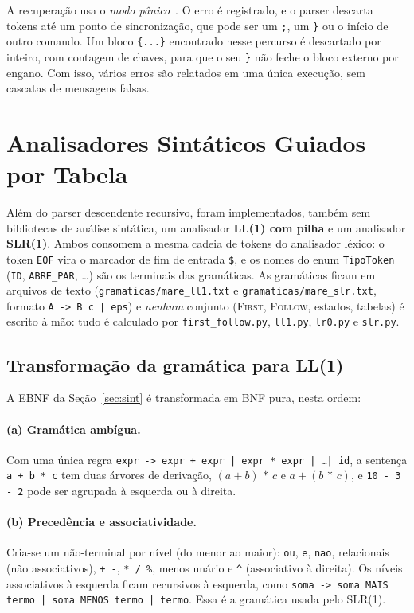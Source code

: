 \documentclass[conference]{IEEEtran}
\begin{document}
A recuperação usa o \emph{modo pânico}~\cite{aho2006}. O erro é registrado, e
o parser descarta tokens até um ponto de sincronização, que pode ser um
\texttt{;}, um \texttt{\}} ou o início de outro comando. Um bloco
\texttt{\{...\}} encontrado nesse percurso é descartado por inteiro, com
contagem de chaves, para que o seu \texttt{\}} não feche o bloco externo por
engano. Com isso, vários erros são relatados em uma única execução, sem
cascatas de mensagens falsas.

\section{Analisadores Sintáticos Guiados por Tabela}\label{sec:tabela}

Além do parser descendente recursivo, foram implementados, também sem
bibliotecas de análise sintática, um analisador \textbf{LL(1) com pilha} e um
analisador \textbf{SLR(1)}. Ambos consomem a mesma cadeia de tokens do
analisador léxico: o token \texttt{EOF} vira o marcador de fim de entrada
\texttt{\$}, e os nomes do enum \texttt{TipoToken} (\texttt{ID},
\texttt{ABRE\_PAR}, \dots) são os terminais das gramáticas. As gramáticas ficam em
arquivos de texto (\texttt{gramaticas/mare\_ll1.txt} e
\texttt{gramaticas/mare\_slr.txt}, formato \texttt{A -> B c | eps}) e
\emph{nenhum} conjunto (\textsc{First}, \textsc{Follow}, estados, tabelas) é
escrito à mão: tudo é calculado por \texttt{first\_follow.py},
\texttt{ll1.py}, \texttt{lr0.py} e \texttt{slr.py}.

\subsection{Transformação da gramática para LL(1)}\label{sec:ll1gram}
A EBNF da Seção~\ref{sec:sint} é transformada em BNF pura, nesta ordem:

\paragraph{(a) Gramática ambígua.} Com uma única regra
\texttt{expr -> expr + expr | expr * expr | \dots | id}, a sentença
\texttt{a + b * c} tem duas árvores de derivação, $(a+b)\,{*}\,c$ e
$a+(b\,{*}\,c)$, e \texttt{10 - 3 - 2} pode ser agrupada à esquerda ou à direita.

\paragraph{(b) Precedência e associatividade.} Cria-se um não-terminal por nível
(do menor ao maior): \texttt{ou}, \texttt{e}, \texttt{nao}, relacionais (não
associativos), \texttt{+ -}, \texttt{* / \%}, menos unário e \texttt{\^{}}
(associativo à direita). Os níveis associativos à esquerda ficam recursivos à
esquerda, como \texttt{soma -> soma MAIS termo | soma MENOS termo | termo}.
Essa é a gramática usada pelo SLR(1).
\end{document}
